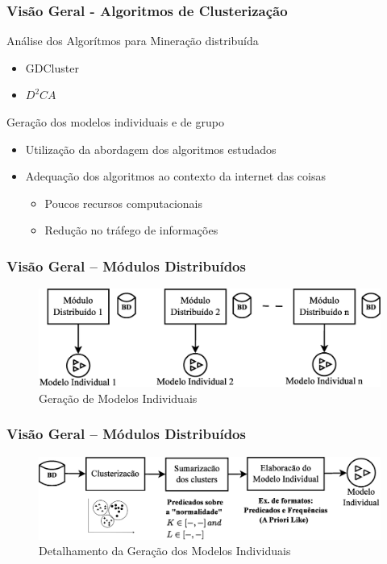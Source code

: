 \documentclass[hyperref={pdfpagelabels=false}]{beamer}
\begin{document}
\begin{frame}
	\frametitle{Visão Geral - Algoritmos de Clusterização}
    Análise dos Algorítmos para Mineração distribuída
   
	\begin{itemize}
	    \item GDCluster \cite{001-000}
        \item $D^{2}CA$ \cite{017-000} 
    \end{itemize}
    
    Geração dos modelos individuais e de grupo \begin{itemize}
            \item Utilização da abordagem dos algoritmos estudados
            \item Adequação dos algoritmos ao contexto da internet das coisas \begin{itemize}
                    \item Poucos recursos computacionais
                    \item Redução no tráfego de informações
            \end{itemize}
    \end{itemize}
%       
\end{frame}
%
\begin{frame}
	\frametitle{Visão Geral -- Módulos Distribuídos}
    \begin{figure}
		\centering
	    \includegraphics[scale=0.35]{img/VisaoGeral-00}
  		\caption{\scriptsize{Geração de Modelos Individuais}}
   	\end{figure}
%
\end{frame}
%
\begin{frame}
	\frametitle{Visão Geral -- Módulos Distribuídos}
    \begin{figure}
		\centering
	    \includegraphics[scale=0.30]{img/VisaoGeral-01}
  		\caption{\scriptsize{Detalhamento da Geração dos Modelos Individuais}}
   	\end{figure}
\end{frame}
\end{document}
